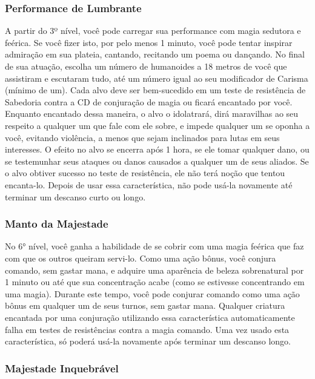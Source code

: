 \documentclass{RPG_Adventure}[2021/10/20]
\begin{document}
\subsubsection{Performance de Lumbrante}%
\label{ssub:performance_de_lumbrante}

A partir do 3º nível, você pode carregar sua performance com magia sedutora e
feérica.
Se você fizer isto, por pelo menos 1 minuto, você pode tentar inspirar admiração
em sua plateia, cantando, recitando um poema ou dançando. No final de sua
atuação, escolha um número de humanoides a 18 metros de você que assistiram e
escutaram tudo, até um número igual ao seu modificador de Carisma (mínimo de
um).
Cada alvo deve ser bem-sucedido em um teste de resistência de Sabedoria contra
a CD de conjuração de magia ou ficará encantado por você. Enquanto encantado
dessa maneira, o alvo o idolatrará, dirá maravilhas ao seu respeito a qualquer
um que fale com ele sobre, e impede qualquer um se oponha a você, evitando
violência, a menos que sejam inclinados para lutas em seus interesses. O efeito
no alvo se encerra após 1 hora, se ele tomar qualquer dano, ou se testemunhar
seus ataques ou danos causados a qualquer um de seus aliados.
Se o alvo obtiver sucesso no teste de resistência, ele não terá noção que tentou
encanta-lo.
Depois de usar essa característica, não pode usá-la novamente até terminar um
descanso curto ou longo.

\subsubsection{Manto da Majestade}%
\label{ssub:manto_da_majestade}

No 6° nível, você ganha a habilidade de se cobrir com uma magia feérica que faz
com que os outros queiram servi-lo. Como uma ação bônus, você conjura comando,
sem gastar mana, e adquire uma aparência de beleza sobrenatural por 1 minuto ou
até que sua concentração acabe (como se estivesse concentrando em uma magia).
Durante este tempo, você pode conjurar comando como uma ação bônus em qualquer
um de seus turnos, sem gastar mana.  Qualquer criatura encantada por uma
conjuração utilizando essa característica automaticamente falha em testes de
resistências contra a magia comando. Uma vez usado esta característica, só
poderá usá-la novamente após terminar um descanso longo.

\subsubsection{Majestade Inquebrável}%
\label{ssub:majestade_inquebravel}
\end{document}
